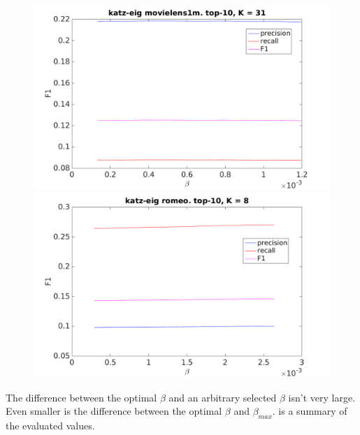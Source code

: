 \begin{figure}[h!]
\centering
\begin{minipage}{.5\textwidth}
    \centering
    \includegraphics[width=\linewidth]{fig/katzeig_beta/movielens_katzeig_beta.png}
\end{minipage}%
\begin{minipage}{.5\textwidth}
    \centering
    \includegraphics[width=\linewidth]{fig/katzeig_beta/romeo_katzeig_beta.png}
\end{minipage}
\end{figure}

\FloatBarrier

The difference between the optimal $\beta$ and an arbitrary selected $\beta$ isn't very large. Even smaller is the difference between the optimal $\beta$ and $\beta_{max}$.   is a summary of the evaluated values.


